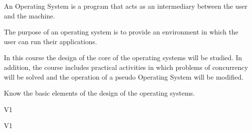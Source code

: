 \begin{syllabus}


\begin{justification}
An Operating System is a program that acts as an intermediary between the user and the machine.

The purpose of an operating system is to provide an environment in which the user can run their applications.

In this course the design of the core of the operating systems will be studied. 
In addition, the course includes practical activities in which problems of concurrency will be solved and the operation of a pseudo Operating System will be modified.
\end{justification}

\begin{goals}
	\item Know the basic elements of the design of the operating systems.
\end{goals}

\begin{outcomes}{V1}
    \item {}
    \item {}
    \item {}
\end{outcomes}

\begin{competences}{V1}
    \item {}
    \item {}
    \item {}
\end{competences}


\end{syllabus}
